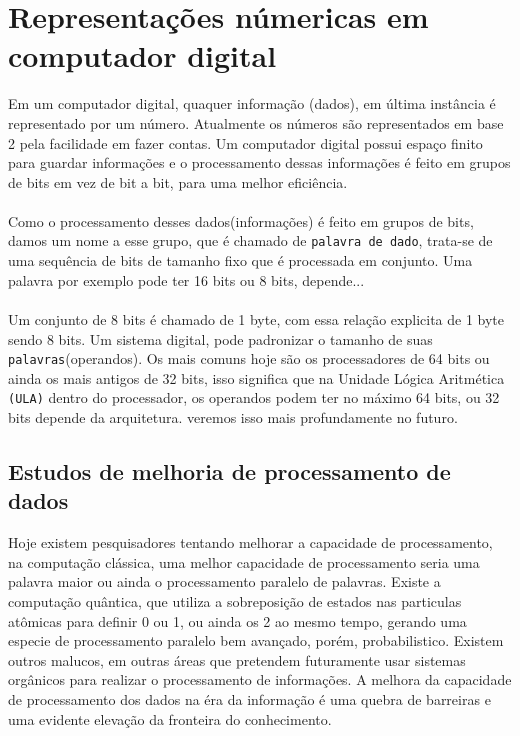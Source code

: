 \documentclass[12pt, onecolumn]{article}
\begin{document}
	\section{Representações númericas em computador digital}
	Em um computador digital, quaquer informação (dados), em última instância
	é representado por um número. Atualmente os números são representados em base 2
	pela facilidade em fazer contas. Um computador digital possui espaço finito
	para guardar informações e o processamento dessas informações é feito em grupos
	de bits em vez de bit a bit, para uma melhor eficiência.\\
	\\
	Como o processamento desses dados(informações) é feito em grupos de bits, damos
	um nome a esse grupo, que é chamado de \texttt{palavra de dado}, trata-se de uma
	sequência de bits de tamanho fixo que é processada em conjunto. Uma palavra
	por exemplo pode ter 16 bits ou 8 bits, depende...\\
	\\
	Um conjunto de 8 bits é chamado de 1 byte, com essa relação explicita de 
	1 byte sendo 8 bits. Um sistema digital, pode padronizar o tamanho de suas 
	\texttt{palavras}(operandos). Os mais comuns hoje são os processadores de 
	64 bits	ou ainda os mais antigos de 32 bits, isso significa que na 
	Unidade Lógica Aritmética \texttt{(ULA)} dentro do processador, 
	os operandos podem ter no máximo 64 bits, ou 32 bits depende da arquitetura. 
	veremos isso mais profundamente no futuro.\\

	\subsection{Estudos de melhoria de processamento de dados}
	Hoje existem pesquisadores tentando melhorar a capacidade de processamento, 
	na computação clássica, uma melhor capacidade de processamento seria uma palavra
	maior ou ainda o processamento paralelo de palavras. Existe a computação
	quântica, que utiliza a sobreposição de estados nas particulas atômicas para
	definir 0 ou 1, ou ainda os 2 ao mesmo tempo, gerando uma especie de 
	processamento paralelo bem avançado, porém, probabilistico. 
	Existem outros malucos, em outras áreas que pretendem futuramente 
	usar sistemas orgânicos para realizar o processamento de informações. 
	A melhora da capacidade de processamento dos dados na éra da informação 
	é uma quebra de barreiras e uma evidente elevação da fronteira do conhecimento.
	\\
\end{document}
